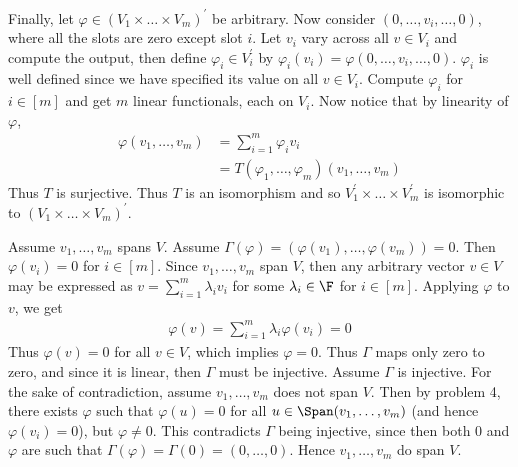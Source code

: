 \documentclass{book}
\begin{document}
\begin{enumerate}[label=\arabic*)]
      Finally, let $\varphi \in (V_1 \times \dots \times V_m)^{\prime}$ be arbitrary. Now consider $(0, \dots, v_i, \dots, 0)$, where all the slots are zero except slot $i$. Let $v_i$ vary
      across all $v \in V_i$ and compute the output, then define $\varphi_i \in V_i^{\prime}$ by $\varphi_i(v_i) = \varphi(0, \dots, v_i, \dots, 0)$. $\varphi_i$ is well defined since we
      have specified its value on all $v \in V_i$. Compute $\varphi_i$ for $i \in [m]$ and get $m$ linear functionals, each on $V_i$. Now notice that by linearity of $\varphi$,
      \begin{align*}
        \varphi(v_1, \dots, v_m) & = \sum_{i = 1}^{m}\varphi_iv_i \\
        & = T(\varphi_1, \dots, \varphi_m)(v_1, \dots, v_m)
      \end{align*}
      Thus $T$ is surjective. Thus $T$ is an isomorphism and so $V_1^{\prime} \times \dots \times V_m^{\prime}$ is isomorphic to $(V_1 \times \dots \times V_m)^{\prime}$.
    \ii
      \begin{enumerate}[label=\alph*)]
        \ii 
          \begin{enumerate}[label=\roman*)]
            \ii 
              Assume $v_1, \dots, v_m$ spans $V$. Assume $\Gamma(\varphi) = \left( \varphi(v_1), \dots, \varphi(v_m) \right) = 0$. Then $\varphi(v_i) = 0$ for $i \in [m]$. Since $v_1, \dots,
              v_m$ span $V$, then any arbitrary vector $v \in V$ may be expressed as $v = \sum_{i = 1}^{m}\lambda_iv_i$ for some $\lambda_i \in \F$ for $i \in [m]$. Applying $\varphi$ to
              $v$, we get
              \begin{align*}
                \varphi(v) = \sum_{i = 1}^{m}\lambda_i\varphi(v_i) = 0
              \end{align*}
              Thus $\varphi(v) = 0$ for all $v \in V$, which implies $\varphi = 0$. Thus $\Gamma$ maps only zero to zero, and since it is linear, then $\Gamma$ must be injective.
            \ii
              Assume $\Gamma$ is injective. For the sake of contradiction, assume $v_1, \dots, v_m$ does not span $V$. Then by problem 4, there exists $\varphi$ such that $\varphi(u) = 0$
              for all $u \in \Span(v_1, \dots, v_m)$ (and hence $\varphi(v_i) = 0$), but $\varphi \neq 0$. This contradicts $\Gamma$ being injective, since then both $0$ and $\varphi$ are
              such that $\Gamma(\varphi) = \Gamma(0) = (0, \dots, 0)$. Hence $v_1, \dots, v_m$ do span $V$.
          \end{enumerate}
        \ii
          \begin{enumerate}[label=\roman*)]

\end{enumerate}
\end{enumerate}
\end{enumerate}
\end{document}
